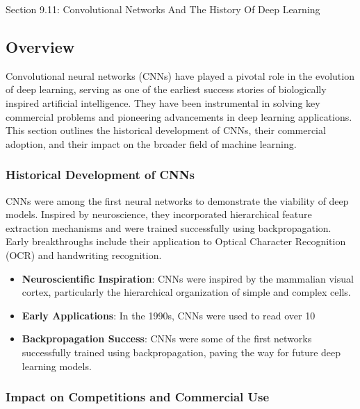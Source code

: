 \begin{notes}{Section 9.11: Convolutional Networks And The History Of Deep Learning}
    \subsection*{Overview}

    Convolutional neural networks (CNNs) have played a pivotal role in the evolution of deep learning, serving as one of the earliest success stories of biologically inspired artificial intelligence. They have 
    been instrumental in solving key commercial problems and pioneering advancements in deep learning applications. This section outlines the historical development of CNNs, their commercial adoption, and 
    their impact on the broader field of machine learning.
    
    \subsubsection*{Historical Development of CNNs}
    
    CNNs were among the first neural networks to demonstrate the viability of deep models. Inspired by neuroscience, they incorporated hierarchical feature extraction mechanisms and were trained successfully 
    using backpropagation. Early breakthroughs include their application to Optical Character Recognition (OCR) and handwriting recognition.
    
    \begin{highlight}
        \begin{itemize}
            \item \textbf{Neuroscientific Inspiration}: CNNs were inspired by the mammalian visual cortex, particularly the hierarchical organization of simple and complex cells.
            \item \textbf{Early Applications}: In the 1990s, CNNs were used to read over 10%
            \item \textbf{Backpropagation Success}: CNNs were some of the first networks successfully trained using backpropagation, paving the way for future deep learning models.
        \end{itemize}
    \end{highlight}
    
    \subsubsection*{Impact on Competitions and Commercial Use}
    

\end{notes}
